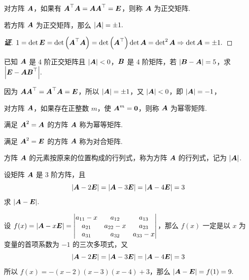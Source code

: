\begin{definition}[正交矩阵]
    对方阵 $ \vb*{A} $，如果有 $ \vb*{A}^{\top} \vb*{A}=\vb*{A} \vb*{A}^{\top}=\vb*{E} $，则称 $ \vb*{A} $ 为正交矩阵.
\end{definition}
\begin{theorem}[正交矩阵的行列式]
    若方阵 $ \vb*{A} $ 为正交矩阵，那么 $|\vb*{A}|=\pm 1.$
\end{theorem}
\begin{proof}[{\songti \textbf{证}}]
    $1=\det\vb*{E}=\det\qty(\vb*{A}^\top\vb*{A})=\det\qty(\vb*{A}^\top)\det\vb*{A}=\det^2\vb*{A}\Rightarrow \det\vb*{A}=\pm 1.$
\end{proof}

\begin{example}
    已知 $\vb*{A}$ 是 4 阶正交矩阵且 $|\vb*{A}|<0$，$\vb*{B}$ 是 4 阶矩阵，若 $|\vb*{B}-\vb*{A}|=5$，求 $\qty|\vb*{E}-\vb*{AB}^\top|.$
\end{example}
\begin{solution}
    因为 $\vb*{AA}^\top=\vb*{A}^\top\vb*{A}=\vb*{E}$，所以 $|\vb*{A}|=\pm 1$，又 $|\vb*{A}|<0$，即 $|\vb*{A}|=-1$，
\end{solution}

\begin{definition}[幂零矩阵]
    对方阵 $ \vb*{A} $，如果存在正整数 $ m $，使 $ \vb*{A}^{m}=\mathbf{0} $，则称 $ \vb*{A} $ 为幂零矩阵.
\end{definition}

\begin{definition}[幂等矩阵]
    满足 $ \vb*{A}^{2}=\vb*{A} $ 的方阵 $ \vb*{A} $ 称为幂等矩阵.
\end{definition}

\begin{definition}[对合矩阵]
    满足 $ \vb*{A}^{2}=\vb*{E} $ 的方阵 $ \vb*{A} $ 称为对合矩阵.
\end{definition}

\begin{definition}[方阵的行列式]
    方阵 $ \vb*{A} $ 的元素按原来的位置构成的行列式，称为方阵 $ \vb*{A} $ 的行列式，记为 $ |\vb*{A}| $.
\end{definition}

\begin{example}
    设矩阵 $\vb*{A}$ 是 3 阶方阵，且 $$|\vb*{A}-2\vb*{E}|=|\vb*{A}-3\vb*{E}|=|\vb*{A}-4\vb*{E}|=3$$
    求 $|\vb*{A}-\vb*{E}|.$
\end{example}
\begin{solution}
    设 $f(x)=|\vb*{A}-x\vb*{E}|=\mqty|a_{11}-x&a_{12}&a_{13}\\a_{21}&a_{22}-x&a_{23}\\a_{31}&a_{32}&a_{33}-x|$，那么 $f(x)$ 一定是以 $x$ 为变量的首项系数为 $-1$ 的三次多项式，又
    $$|\vb*{A}-2\vb*{E}|=|\vb*{A}-3\vb*{E}|=|\vb*{A}-4\vb*{E}|=3$$
    所以 $f(x)=-(x-2)(x-3)(x-4)+3$，那么 $|\vb*{A}-\vb*{E}|=f(1)=9.$
\end{solution}


